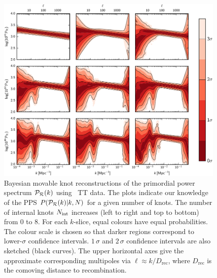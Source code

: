 \begin{figure}[tp]
  \includegraphics[width=\textwidth]{chapters/pps_reconstruction/figures/array}
  \caption{Bayesian movable knot reconstructions of the primordial power spectrum \(\mathcal{P}_\mathcal{R}(k)\) using \Planck\ TT data.
    The plots indicate our knowledge of the PPS \(P(\mathcal{P}_\mathcal{R}(k)|k,N)\) for a given number of knots.
    The number of internal knots \(N_\mathrm{int}\) increases (left to right and top to bottom) from \(0\) to \(8\).
    For each \(k\)-slice, equal colours have equal probabilities. The colour scale is chosen so that darker regions
    correspond to lower-\(\sigma\) confidence intervals.
    \(1\,\sigma \) and \(2\,\sigma \) confidence intervals are also sketched (black curves).
    The upper horizontal axes give the approximate corresponding multipoles via \(\ell \approx k/D_\mathrm{rec}\),
    where \(D_\mathrm{rec}\) is the comoving distance to recombination.\label{fig:Pkr0}
  }
\end{figure}


